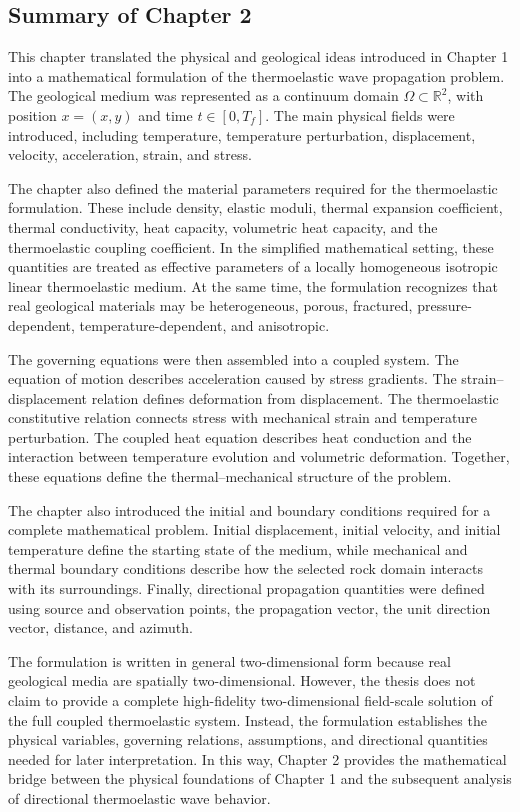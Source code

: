 \subsection{Summary of Chapter 2}

This chapter translated the physical and geological ideas introduced in Chapter 1 into a mathematical formulation of the thermoelastic wave propagation problem. The geological medium was represented as a continuum domain \(\Omega \subset \mathbb{R}^2\), with position \(x=(x, y)\) and time \(t\in[0,T_f]\). The main physical fields were introduced, including temperature, temperature perturbation, displacement, velocity, acceleration, strain, and stress.

The chapter also defined the material parameters required for the thermoelastic formulation. These include density, elastic moduli, thermal expansion coefficient, thermal conductivity, heat capacity, volumetric heat capacity, and the thermoelastic coupling coefficient. In the simplified mathematical setting, these quantities are treated as effective parameters of a locally homogeneous isotropic linear thermoelastic medium. At the same time, the formulation recognizes that real geological materials may be heterogeneous, porous, fractured, pressure-dependent, temperature-dependent, and anisotropic.

The governing equations were then assembled into a coupled system. The equation of motion describes acceleration caused by stress gradients. The strain--displacement relation defines deformation from displacement. The thermoelastic constitutive relation connects stress with mechanical strain and temperature perturbation. The coupled heat equation describes heat conduction and the interaction between temperature evolution and volumetric deformation. Together, these equations define the thermal--mechanical structure of the problem.

The chapter also introduced the initial and boundary conditions required for a complete mathematical problem. Initial displacement, initial velocity, and initial temperature define the starting state of the medium, while mechanical and thermal boundary conditions describe how the selected rock domain interacts with its surroundings. Finally, directional propagation quantities were defined using source and observation points, the propagation vector, the unit direction vector, distance, and azimuth.

The formulation is written in general two-dimensional form because real geological media are spatially two-dimensional. However, the thesis does not claim to provide a complete high-fidelity two-dimensional field-scale solution of the full coupled thermoelastic system. Instead, the formulation establishes the physical variables, governing relations, assumptions, and directional quantities needed for later interpretation. In this way, Chapter 2 provides the mathematical bridge between the physical foundations of Chapter 1 and the subsequent analysis of directional thermoelastic wave behavior.
